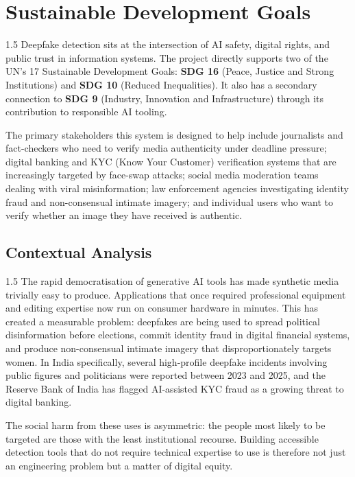 \section{Sustainable Development Goals}

\begin{spacing}{1.5}
Deepfake detection sits at the intersection of AI safety, digital rights, and public trust in information systems. The project directly supports two of the UN's 17 Sustainable Development Goals: \textbf{SDG 16} (Peace, Justice and Strong Institutions) and \textbf{SDG 10} (Reduced Inequalities). It also has a secondary connection to \textbf{SDG 9} (Industry, Innovation and Infrastructure) through its contribution to responsible AI tooling.

The primary stakeholders this system is designed to help include journalists and fact-checkers who need to verify media authenticity under deadline pressure; digital banking and KYC (Know Your Customer) verification systems that are increasingly targeted by face-swap attacks; social media moderation teams dealing with viral misinformation; law enforcement agencies investigating identity fraud and non-consensual intimate imagery; and individual users who want to verify whether an image they have received is authentic.
\end{spacing}

\subsection{Contextual Analysis}

\begin{spacing}{1.5}
The rapid democratisation of generative AI tools has made synthetic media trivially easy to produce. Applications that once required professional equipment and editing expertise now run on consumer hardware in minutes. This has created a measurable problem: deepfakes are being used to spread political disinformation before elections, commit identity fraud in digital financial systems, and produce non-consensual intimate imagery that disproportionately targets women. In India specifically, several high-profile deepfake incidents involving public figures and politicians were reported between 2023 and 2025, and the Reserve Bank of India has flagged AI-assisted KYC fraud as a growing threat to digital banking.

The social harm from these uses is asymmetric: the people most likely to be targeted are those with the least institutional recourse. Building accessible detection tools that do not require technical expertise to use is therefore not just an engineering problem but a matter of digital equity.
\end{spacing}

